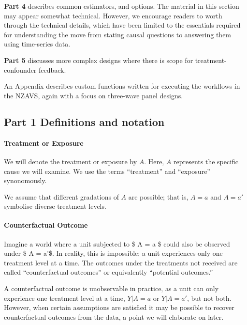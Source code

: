 \documentclass[
  singlecolumn]{article}
\let\oldparagraph\paragraph
\renewcommand{\paragraph}[1]{\oldparagraph{#1}\mbox{}}
\begin{document}
\textbf{Part 4} describes common estimators, and options. The material
in this section may appear somewhat technical. However, we encourage
readers to worth through the technical details, which have been limited
to the essentials required for understanding the move from stating
causal questions to answering them using time-series data.

\textbf{Part 5} discusses more complex designs where there is scope for
treatment-confounder feedback.

An Appendix describes custom functions written for executing the
workflows in the NZAVS, again with a focus on three-wave panel designs.

\subsection{\texorpdfstring{\textbf{Part 1} Definitions and
notation}{Part 1 Definitions and notation}}\label{part-1-definitions-and-notation}

\paragraph{Treatment or Exposure}\label{treatment-or-exposure}

We will denote the treatment or exposure by \(A\). Here, \(A\)
represents the specific cause we will examine. We use the terms
``treatment'' and ``exposure'' synonomously.

We assume that different gradations of \(A\) are possible; that is,
\(A = a\) and \(A = a'\) symbolise diverse treatment levels.

\paragraph{Counterfactual Outcome}\label{counterfactual-outcome}

Imagine a world where a unit subjected to \$ A = a \$ could also be
observed under \$ A = a'\$. In reality, this is impossible; a unit
experiences only one treatment level at a time. The outcomes under the
treatments not received are called ``counterfactual outcomes'' or
equivalently ``potential outcomes.''

A counterfactual outcome is unobservable in practice, as a unit can only
experience one treatment level at a time, \(Y|A=a\) or \(Y|A=a'\), but
not both. However, when certain assumptions are satisfied it may be
possible to recover counterfactual outcomes from the data, a point we
will elaborate on later.
\end{document}

